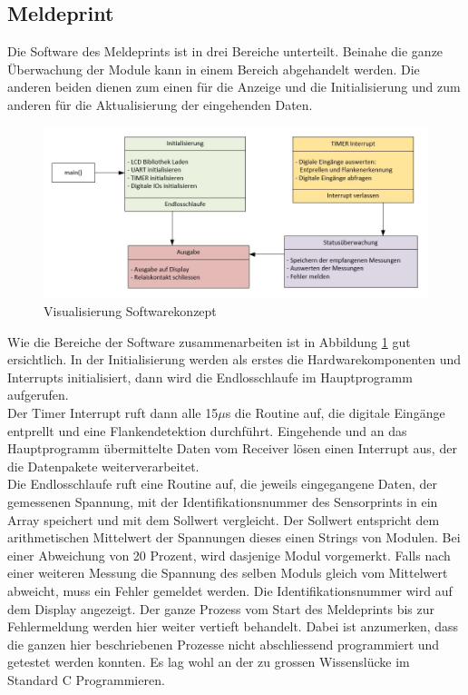 \subsection{Meldeprint}
Die Software des Meldeprints ist in drei Bereiche unterteilt. Beinahe die ganze Überwachung der Module kann in einem Bereich abgehandelt werden. Die anderen beiden dienen zum einen für die Anzeige und die Initialisierung und zum anderen für die Aktualisierung der eingehenden Daten.

\begin{figure}[htbp] 
  \centering
     \includegraphics[width=1\textwidth]{graphics/reportboard-software-river}
  \caption{Visualisierung Softwarekonzept}
  \label{fig:reportboard-software-river}
\end{figure}

Wie die Bereiche der Software zusammenarbeiten ist in Abbildung \ref{fig:reportboard-software-river} gut ersichtlich. In der Initialisierung werden als erstes die Hardwarekomponenten und Interrupts initialisiert, dann wird die Endlosschlaufe im Hauptprogramm aufgerufen.\\
Der Timer Interrupt ruft dann alle 15$\mu$s die Routine auf, die digitale Eingänge entprellt und eine Flankendetektion durchführt. Eingehende und an das Hauptprogramm übermittelte Daten vom Receiver lösen einen Interrupt aus, der die Datenpakete weiterverarbeitet.\\
Die Endlosschlaufe ruft eine Routine auf, die jeweils eingegangene Daten, der gemessenen Spannung, mit der Identifikationsnummer des Sensorprints in ein Array speichert und mit dem Sollwert vergleicht. Der Sollwert entspricht dem arithmetischen Mittelwert der Spannungen dieses einen Strings von Modulen. Bei einer Abweichung von 20 Prozent, wird dasjenige Modul vorgemerkt. Falls nach einer weiteren Messung die Spannung des selben Moduls gleich vom Mittelwert abweicht, muss ein Fehler gemeldet werden. Die Identifikationsnummer wird auf dem Display angezeigt. Der ganze Prozess vom Start des Meldeprints bis zur Fehlermeldung werden hier weiter vertieft behandelt. Dabei ist anzumerken, dass die ganzen hier beschriebenen Prozesse nicht abschliessend programmiert und getestet werden konnten. Es lag wohl an der zu grossen Wissenslücke im Standard C Programmieren.
